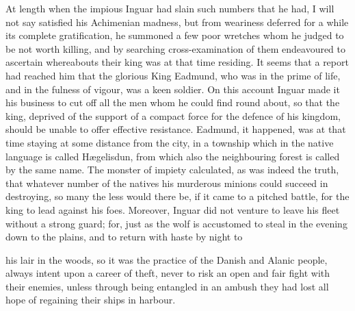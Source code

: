 \documentclass[10pt]{book}
\begin{document}
\begin{paracol}{2}
At length when the impious Inguar had slain such numbers that he had, I will not say satisfied his Achimenian madness, but from weariness deferred for a while its complete gratification, he summoned a few poor wretches whom he judged to be not worth killing, and by searching cross-examination of them endeavoured to ascertain whereabouts their king was at that time residing. It seems that a report had reached him that the glorious King Eadmund, who was in the prime of life, and in the fulness of vigour, was a keen soldier. On this account Inguar made it his business to cut off all the men whom he could find round about, so that the king, deprived of the support of a compact force for the defence of his kingdom, should be unable to offer effective resistance. Eadmund, it happened, was at that time staying at some distance from the city, in a township which in the native language is called H\ae{}gelisdun, from which also the neighbouring forest is called by the same name. The monster of impiety calculated, as was indeed the truth, that whatever number of the natives his murderous minions could succeed in destroying, so many the less would there be, if it came to a pitched battle, for the king to lead against his foes. Moreover, Inguar did not venture to leave his fleet without a strong guard; for, just as the wolf is accustomed to steal in the evening down to the plains, and to return with haste by night to\linebreak{}

\end{paracol}

\vspace{-2\parskip}
\vspace{-3\lineskip}
his lair in the woods, so it was the practice of the Danish and Alanic people, always intent upon a career of theft, never to risk an open and fair fight with their enemies, unless through being entangled in an ambush they had lost all hope of regaining their ships in harbour.
\end{document}
